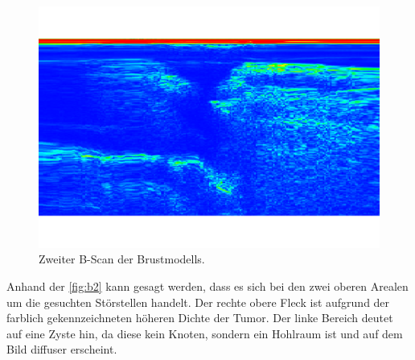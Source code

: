 \begin{figure}[H]
    \centering
	\includegraphics[width=0.8\linewidth]{content/grafik/Super_Tumor.pdf}
    \captionsetup{width=0.765\linewidth}
	\caption{Zweiter B-Scan der Brustmodells.}
	\label{fig:b2}
\end{figure}

Anhand der \autoref{fig:b2} kann gesagt werden, dass es sich bei den zwei oberen Arealen um die gesuchten
Störstellen handelt. Der rechte obere Fleck ist aufgrund der farblich gekennzeichneten höheren Dichte der Tumor. Der linke Bereich deutet auf eine 
Zyste hin, da diese kein Knoten, sondern ein Hohlraum ist und auf dem Bild diffuser erscheint.
